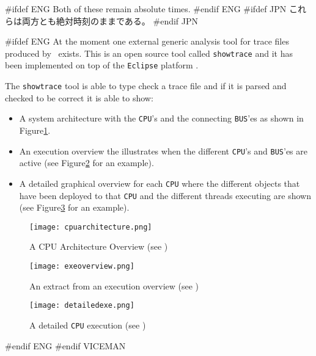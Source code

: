 \documentclass[\pformat,12pt]{article}
\begin{document}
#ifdef ENG
Both of these remain absolute times.
#endif ENG
#ifdef JPN
これらは両方とも絶対時刻のままである。
#endif JPN

#ifdef ENG
At the moment one external generic analysis tool for trace files produced by
\VDMTools\ exists. This is an open source tool called \texttt{showtrace} and
it has been implemented on top of the \texttt{Eclipse} platform 
\cite{Carlson05}. 

The \texttt{showtrace} tool is able to type check a trace file and if it 
is parsed and checked to be correct it is able to show:

\begin{itemize}
\item A system architecture with the \texttt{CPU}'s and the connecting
      \texttt{BUS}'es as shown in Figure\ref{fig:cpuarchitecture}.
\item An execution overview the illustrates when the different 
      \texttt{CPU}'s and \texttt{BUS}'es are active (see 
      Figure\ref{fig:exeoverview} for an example).
\item A detailed graphical overview for each \texttt{CPU} where the
      different objects that have been deployed to that \texttt{CPU} and
      the different threads executing are shown (see 
      Figure\ref{fig:detailedexe} for an example).
\end{itemize}

\begin{figure}
\begin{center}
\texttt{[image: cpuarchitecture.png]}
\end{center}
\caption{A CPU Architecture Overview (see \cite{VICEGuide-CSK})
\label{fig:cpuarchitecture}}
\end{figure}

\begin{figure}
\begin{center}
\texttt{[image: exeoverview.png]}
\end{center}
\caption{An extract from an execution overview (see \cite{VICEGuide-CSK})}
\label{fig:exeoverview}
\end{figure}

\begin{figure}
\begin{center}
\texttt{[image: detailedexe.png]}
\end{center}
\caption{A detailed \texttt{CPU} execution (see \cite{VICEGuide-CSK})}
\label{fig:detailedexe}
\end{figure}
#endif ENG
#endif VICEMAN
\end{document}
